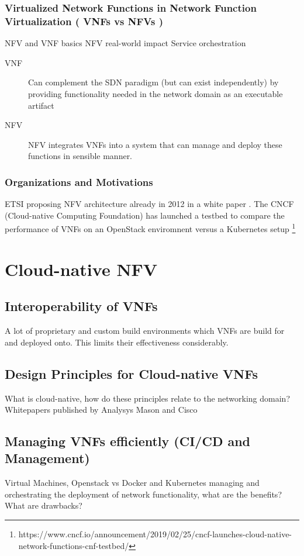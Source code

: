 \subsubsection{Virtualized Network Functions in Network Function Virtualization ( VNFs vs NFVs )}
NFV and VNF basics \cite{mijumbi2016network} NFV real-world impact \cite{bilal2016impact} Service orchestration \cite{de2018network}

\begin{description}
	\item [VNF] Can complement the SDN paradigm (but can exist independently)  by providing functionality needed in the network domain as an executable artifact
	\item [NFV] NFV integrates VNFs into a system that can manage and deploy these functions in sensible manner. 
\end{description}
\subsubsection{Organizations and Motivations}
ETSI proposing NFV architecture already in 2012 in a white paper  \cite{nfv_wp}. The CNCF (Cloud-native Computing Foundation) has launched a testbed to compare the performance of VNFs on an OpenStack enviromnent versus a Kubernetes setup \footnote{https://www.cncf.io/announcement/2019/02/25/cncf-launches-cloud-native-network-functions-cnf-testbed/}	

\section{Cloud-native NFV}
\subsection{Interoperability of VNFs}
A lot of proprietary and custom build environments which VNFs are build for and deployed onto. This limits their effectiveness considerably.
\subsection{Design Principles for Cloud-native VNFs }
What is cloud-native, how do these principles relate to  the networking domain? Whitepapers published by Analysys Mason \cite{evolutionnfv} and Cisco \cite{CNF}
\subsection{Managing VNFs efficiently (CI/CD and Management)}
Virtual Machines, Openstack vs Docker and Kubernetes managing and orchestrating the deployment of network functionality, what are the benefits? What are drawbacks?
